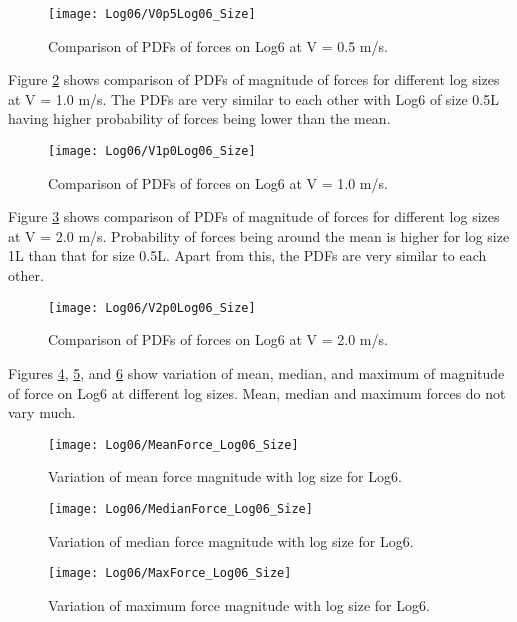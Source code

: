 \begin{figure}
\centering
\texttt{[image: Log06/V0p5Log06\_Size]}
\caption{\label{fig:V0p5Log06_Size}Comparison of PDFs of forces on Log6 at V = 0.5 m/s.}
\end{figure}

\noindent Figure \ref{fig:V1p0Log06_Size} shows comparison of PDFs of magnitude of forces for different log sizes at V = 1.0 m/s. The PDFs are very similar to each other with Log6 of size 0.5L having higher probability of forces being lower than the mean.  

\begin{figure}
\centering
\texttt{[image: Log06/V1p0Log06\_Size]}
\caption{\label{fig:V1p0Log06_Size}Comparison of PDFs of forces on Log6 at V = 1.0 m/s.}
\end{figure}

\noindent Figure \ref{fig:V2p0Log06_Size} shows comparison of PDFs of magnitude of forces for different log sizes at V = 2.0 m/s. Probability of forces being around the mean is higher for log size 1L than that for size 0.5L. Apart from this, the PDFs are very similar to each other. 

\begin{figure}
\centering
\texttt{[image: Log06/V2p0Log06\_Size]}
\caption{\label{fig:V2p0Log06_Size}Comparison of PDFs of forces on Log6 at V = 2.0 m/s.}
\end{figure}

\noindent Figures \ref{fig:MeanForce_Log06_Size}, \ref{fig:MedianForce_Log06_Size}, and \ref{fig:MaxForce_Log06_Size} show variation of mean, median, and maximum of magnitude of force on Log6 at different log sizes. Mean, median and maximum forces do not vary much.

\begin{figure}
\centering
\texttt{[image: Log06/MeanForce\_Log06\_Size]}
\caption{\label{fig:MeanForce_Log06_Size}Variation of mean force magnitude with log size for Log6.}
\end{figure}
\begin{figure}
\centering
\texttt{[image: Log06/MedianForce\_Log06\_Size]}
\caption{\label{fig:MedianForce_Log06_Size}Variation of median force magnitude with log size for Log6.}
\end{figure}
\begin{figure}
\centering
\texttt{[image: Log06/MaxForce\_Log06\_Size]}
\caption{\label{fig:MaxForce_Log06_Size}Variation of maximum force magnitude with log size for Log6.}
\end{figure}

